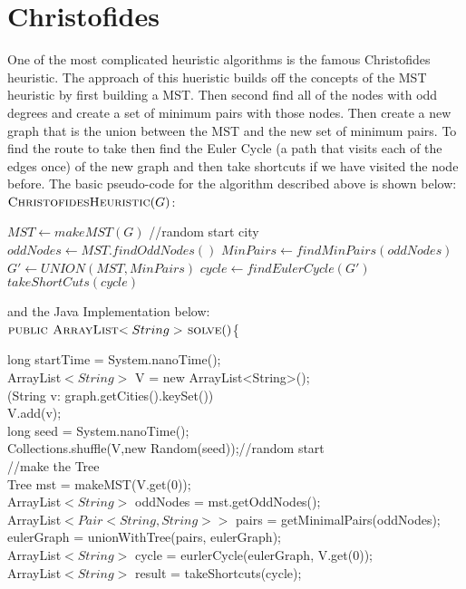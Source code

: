 \documentclass[midd]{thesis}
\newcommand{\tab}{\hspace*{2em}}
\begin{document}
\section{Christofides}
\tab One of the most complicated heuristic algorithms is the famous Christofides heuristic. The approach of this hueristic builds off the concepts of the MST heuristic by first building a MST. Then second find all of the nodes with odd degrees and create a set of minimum pairs with those nodes. Then create a new graph that is the union between the MST and the new set of minimum pairs. To find the route to take then find the Euler Cycle (a path that visits each of the edges once) of the new graph and then take shortcuts if we have visited the node before. The basic pseudo-code for the algorithm described above is shown below:\\
$\textnormal{\scshape ChristofidesHeuristic}(G)$:
\begin{codebox}
\li $MST \gets makeMST(G)$ //random start city
\li $oddNodes \gets MST.findOddNodes()$
\li $MinPairs \gets findMinPairs(oddNodes)$
\li $G' \gets UNION(MST,MinPairs)$
\li $cycle \gets findEulerCycle(G')$
\li\Return $takeShortCuts(cycle)$
\end{codebox}
and the Java Implementation below:\\
$\textnormal{\scshape public ArrayList$<String>$ solve}()$\{
\begin{codebox}
\tab long startTime = System.nanoTime();\\
\tab ArrayList$<String>$ V = new ArrayList<String>();\\
\tab \For(String v: graph.getCities().keySet()) \\
\tab\tab V.add(v);\\
\tab long seed = System.nanoTime();\\
\tab Collections.shuffle(V,new Random(seed));//random start\\
\tab //make the Tree\\
\tab Tree mst = makeMST(V.get(0));\\
\tab ArrayList$<String>$ oddNodes = mst.getOddNodes();\\
\tab ArrayList$<Pair<String,String>>$ pairs = getMinimalPairs(oddNodes);\\
\tab eulerGraph = unionWithTree(pairs, eulerGraph);\\
\tab ArrayList$<String>$ cycle =  eurlerCycle(eulerGraph, V.get(0));\\
\tab ArrayList$<String>$ result = takeShortcuts(cycle);\\
\end{codebox}
\end{document}
